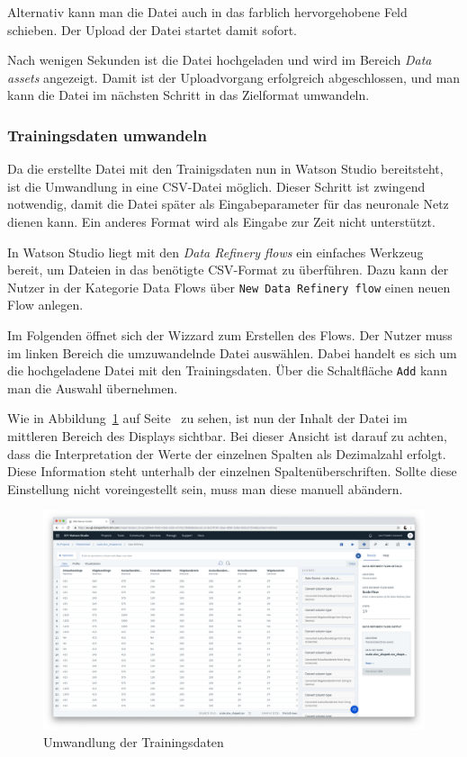 Alternativ kann man die Datei auch in das farblich hervorgehobene Feld schieben. Der Upload der Datei startet damit
sofort.

Nach wenigen Sekunden ist die Datei hochgeladen und wird im Bereich \textit{Data assets} angezeigt. Damit ist der
Uploadvorgang erfolgreich abgeschlossen, und man kann die Datei im nächsten Schritt in das Zielformat umwandeln.

\subsubsection{Trainingsdaten umwandeln}
Da die erstellte Datei mit den Trainigsdaten nun in Watson Studio bereitsteht, ist die Umwandlung in eine CSV-Datei
möglich. Dieser Schritt ist zwingend notwendig, damit die Datei später als Eingabeparameter für das neuronale Netz
dienen kann. Ein anderes Format wird als Eingabe zur Zeit nicht unterstützt.

In Watson Studio liegt mit den \textit{Data Refinery flows} ein einfaches Werkzeug bereit, um Dateien in das benötigte
CSV-Format zu überführen. Dazu kann der Nutzer in der Kategorie Data Flows über \texttt{New Data Refinery flow} einen
neuen Flow anlegen.

Im Folgenden öffnet sich der Wizzard zum Erstellen des Flows. Der Nutzer muss im linken Bereich die umzuwandelnde Datei
auswählen. Dabei handelt es sich um die hochgeladene Datei mit den Trainingsdaten. Über die Schaltfläche \texttt{Add}
kann man die Auswahl übernehmen.

Wie in Abbildung~\ref{fig:umsetzung_data_flow} auf Seite~\pageref{fig:umsetzung_data_flow} zu sehen, ist nun der Inhalt
der Datei im mittleren Bereich des Displays sichtbar. Bei dieser Ansicht ist darauf zu achten, dass die Interpretation
der Werte der einzelnen Spalten als Dezimalzahl erfolgt. Diese Information steht unterhalb der einzelnen
Spaltenüberschriften. Sollte diese Einstellung nicht voreingestellt sein, muss man diese manuell abändern.

\begin{figure}[h]
    \centering
    \includegraphics[width=\textwidth]{images/kapitel_3/umsetzung_data_flow.png}
    \caption{Umwandlung der Trainingsdaten}
    \label{fig:umsetzung_data_flow}
\end{figure}

